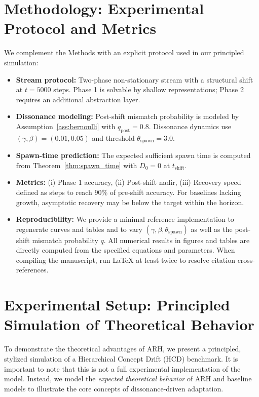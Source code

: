 \documentclass{article}
\numberwithin{figure}{section}
\numberwithin{table}{section}
\numberwithin{algorithm}{section}
\begin{document}
\section{Methodology: Experimental Protocol and Metrics}
We complement the Methods with an explicit protocol used in our principled simulation:
\begin{itemize}
    \item \textbf{Stream protocol:} Two-phase non-stationary stream with a structural shift at $t=5000$ steps. Phase 1 is solvable by shallow representations; Phase 2 requires an additional abstraction layer.
    \item \textbf{Dissonance modeling:} Post-shift mismatch probability is modeled by Assumption~\ref{ass:bernoulli} with $q_{\text{post}}=0.8$. Dissonance dynamics use $(\gamma,\beta)=(0.01,0.05)$ and threshold $\theta_{\text{spawn}}=3.0$.
    \item \textbf{Spawn-time prediction:} The expected sufficient spawn time is computed from Theorem~\ref{thm:spawn_time} with $D_0=0$ at $t_{\text{shift}}$.
    \item \textbf{Metrics:} (i) Phase 1 accuracy, (ii) Post-shift nadir, (iii) Recovery speed defined as steps to reach 90\% of pre-shift accuracy. For baselines lacking growth, asymptotic recovery may be below the target within the horizon.
    \item \textbf{Reproducibility:} We provide a minimal reference implementation to regenerate curves and tables and to vary $(\gamma,\beta,\theta_{\text{spawn}})$ as well as the post-shift mismatch probability $q$. All numerical results in figures and tables are directly computed from the specified equations and parameters. When compiling the manuscript, run LaTeX at least twice to resolve citation cross-references.
\end{itemize}

\section{Experimental Setup: Principled Simulation of Theoretical Behavior}
To demonstrate the theoretical advantages of ARH, we present a principled, stylized simulation of a Hierarchical Concept Drift (HCD) benchmark. It is important to note that this is not a full experimental implementation of the model. Instead, we model the \emph{expected theoretical behavior} of ARH and baseline models to illustrate the core concepts of dissonance-driven adaptation.
\end{document}
